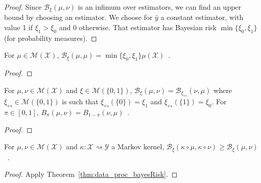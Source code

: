 \begin{proof}%
{}
Since $\mathcal B_\xi(\mu, \nu)$ is an infimum over estimators, we can find an upper bound by choosing an estimator.
We choose for $\hat{y}$ a constant estimator, with value 1 if $\xi_1 > \xi_0$ and 0 otherwise.
That estimator has Bayesian risk $\min\{\xi_0, \xi_1\}$ (for probability measures).
\end{proof}

\begin{lemma}
  \label{lem:bayesBinaryRisk_self}
  \leanok
  For $\mu \in \mathcal M(\mathcal X)$, $\mathcal B_\xi(\mu, \mu) = \min\{\xi_0, \xi_1\} \mu(\mathcal X)$~.
\end{lemma}

\begin{proof}%
\uses{}
\end{proof}

\begin{lemma}
  \label{lem:bayesBinaryRisk_symm}
  \leanok
  For $\mu, \nu \in \mathcal M(\mathcal X)$ and $\xi \in \mathcal M(\{0,1\})$, $\mathcal B_\xi(\mu, \nu) = \mathcal B_{\xi_{\leftrightarrow}}(\nu, \mu)$ where $\xi_{\leftrightarrow} \in \mathcal M(\{0,1\})$ is such that $\xi_{\leftrightarrow}(\{0\}) = \xi_1$ and $\xi_{\leftrightarrow}(\{1\}) = \xi_0$.
  For $\pi \in [0,1]$, $B_\pi(\mu, \nu) = B_{1 - \pi}(\nu, \mu)$~.
\end{lemma}

\begin{proof}%
\uses{}

\end{proof}

\begin{theorem}
  \label{thm:data_proc_bayesBinaryRisk}
  \leanok
  For $\mu, \nu \in \mathcal M(\mathcal X)$ and $\kappa : \mathcal X \rightsquigarrow \mathcal Y$ a Markov kernel, $\mathcal B_\xi(\kappa \circ \mu, \kappa \circ \nu) \ge \mathcal B_\xi(\mu, \nu)$~.
\end{theorem}

\begin{proof}\leanok
{}
Apply Theorem~\ref{thm:data_proc_bayesRisk}.
\end{proof}


